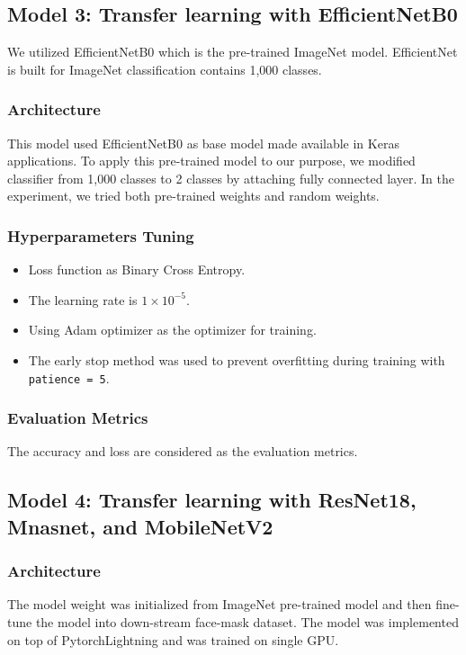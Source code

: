 \documentclass[conference]{IEEEtran}
\begin{document}
\subsection{Model 3: Transfer learning with EfficientNetB0}
We utilized EfficientNetB0\cite{DBLP:journals/corr/abs-1905-11946}  which is the pre-trained ImageNet model. EfficientNet is built for ImageNet classification contains 1,000 classes.
\subsubsection{Architecture}
This model used EfficientNetB0 as base model made available in Keras applications. To apply this pre-trained model to our purpose, we modified classifier from 1,000 classes to 2 classes by attaching fully connected layer. In the experiment, we tried both pre-trained weights and random weights.

\subsubsection{Hyperparameters Tuning}
\begin{itemize}
    \item Loss function as Binary Cross Entropy.
    \item The learning rate is $1\times10^{-5}$.
    \item Using Adam optimizer as the optimizer for training. 
    \item The early stop method was used to prevent overfitting during training with \texttt{patience = 5}.
\end{itemize}

\subsubsection{Evaluation Metrics}
The accuracy and loss are considered as the evaluation metrics.


\subsection{Model 4: Transfer learning with ResNet18, Mnasnet, and MobileNetV2}
\subsubsection{Architecture} The model weight was initialized from ImageNet pre-trained model and then fine-tune the model into down-stream face-mask dataset. The model was implemented on top of PytorchLightning and was trained on single GPU.
\end{document}
